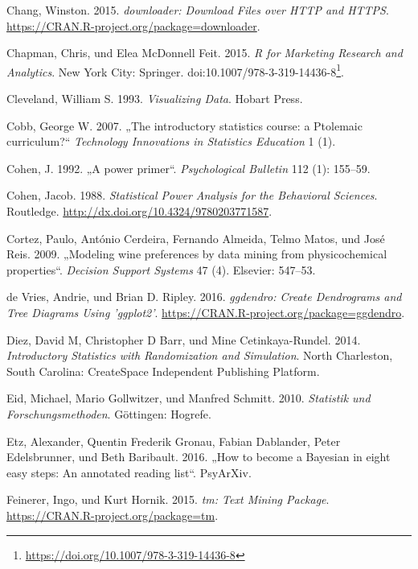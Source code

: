 \documentclass[12pt,ngerman,]{book}
\let\rmarkdownfootnote\footnote%
\def\footnote{\protect\rmarkdownfootnote}
\renewcommand{\href}[2]{#2\footnote{\url{#1}}}
\begin{document}
\hypertarget{ref-R-downloader}{}
Chang, Winston. 2015. \emph{downloader: Download Files over HTTP and
HTTPS}. \url{https://CRAN.R-project.org/package=downloader}.

\hypertarget{ref-Chapman2015}{}
Chapman, Chris, und Elea McDonnell Feit. 2015. \emph{R for Marketing
Research and Analytics}. New York City: Springer.
doi:\href{https://doi.org/10.1007/978-3-319-14436-8}{10.1007/978-3-319-14436-8}.

\hypertarget{ref-Cleveland}{}
Cleveland, William S. 1993. \emph{Visualizing Data}. Hobart Press.

\hypertarget{ref-cobb2007introductory}{}
Cobb, George W. 2007. „The introductory statistics course: a Ptolemaic
curriculum?`` \emph{Technology Innovations in Statistics Education} 1
(1).

\hypertarget{ref-Cohen1992}{}
Cohen, J. 1992. „A power primer``. \emph{Psychological Bulletin} 112
(1): 155--59.

\hypertarget{ref-cohen_statistical_1988}{}
Cohen, Jacob. 1988. \emph{Statistical Power Analysis for the Behavioral
Sciences}. Routledge. \url{http://dx.doi.org/10.4324/9780203771587}.

\hypertarget{ref-cortez2009modeling}{}
Cortez, Paulo, António Cerdeira, Fernando Almeida, Telmo Matos, und José
Reis. 2009. „Modeling wine preferences by data mining from
physicochemical properties``. \emph{Decision Support Systems} 47 (4).
Elsevier: 547--53.

\hypertarget{ref-R-ggdendro}{}
de Vries, Andrie, und Brian D. Ripley. 2016. \emph{ggdendro: Create
Dendrograms and Tree Diagrams Using 'ggplot2'}.
\url{https://CRAN.R-project.org/package=ggdendro}.

\hypertarget{ref-introstats}{}
Diez, David M, Christopher D Barr, und Mine Cetinkaya-Rundel. 2014.
\emph{Introductory Statistics with Randomization and Simulation}. North
Charleston, South Carolina: CreateSpace Independent Publishing Platform.

\hypertarget{ref-eid2010statistik}{}
Eid, Michael, Mario Gollwitzer, und Manfred Schmitt. 2010.
\emph{Statistik und Forschungsmethoden}. Göttingen: Hogrefe.

\hypertarget{ref-etz2016become}{}
Etz, Alexander, Quentin Frederik Gronau, Fabian Dablander, Peter
Edelsbrunner, und Beth Baribault. 2016. „How to become a Bayesian in
eight easy steps: An annotated reading list``. PsyArXiv.

\hypertarget{ref-R-tm}{}
Feinerer, Ingo, und Kurt Hornik. 2015. \emph{tm: Text Mining Package}.
\url{https://CRAN.R-project.org/package=tm}.
\end{document}
